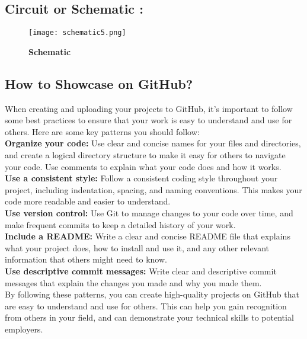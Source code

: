 \documentclass[12pt]{article}
\begin{document}
  \subsection*{\textbf{Circuit or Schematic :}}
 
    \begin{figure}[h]
\centering
\texttt{[image: schematic5.png]}
\caption{\textbf{Schematic}}
\label{schematic_diagram5}
\end{figure}
 
\pagebreak
\begin{center}
\section*{How to Showcase on GitHub?}
\end{center}
When creating and uploading your projects to GitHub, it's important to follow some best practices to ensure that your work is easy to understand and use for others. Here are some key patterns you should follow:\\

\textbf{Organize your code:} Use clear and concise names for your files and directories, and create a logical directory structure to make it easy for others to navigate your code. Use comments to explain what your code does and how it works.\\

\textbf{Use a consistent style:} Follow a consistent coding style throughout your project, including indentation, spacing, and naming conventions. This makes your code more readable and easier to understand.\\

\textbf{Use version control:} Use Git to manage changes to your code over time, and make frequent commits to keep a detailed history of your work.\\

\textbf{Include a README:} Write a clear and concise README file that explains what your project does, how to install and use it, and any other relevant information that others might need to know.\\

\textbf{Use descriptive commit messages:} Write clear and descriptive commit messages that explain the changes you made and why you made them.\\

By following these patterns, you can create high-quality projects on GitHub that are easy to understand and use for others. This can help you gain recognition from others in your field, and can demonstrate your technical skills to potential employers.
\\
\end{document}

